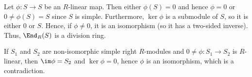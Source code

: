 Let $\phi\colon S\to S$ be an $R$-linear map. Then either
$\phi(S) = 0$ and hence $\phi = 0$ or $0\neq \phi(S) = S$ since $S$ is simple.
Furthermore, $\ker \phi$ is a submodule of $S$, so it is either $0$ or $S$. Hence,
if $\phi\neq 0$, it is an isomorphism (so it has a two-sided inverse).
Thus, $\End_R(S)$ is a division ring.

If $S_1$ and $S_2$ are non-isomorphic simple right $R$-modules and
$0\neq\phi\colon S_1\to S_2$ is  $R$-linear, then $\im\phi = S_2$ and
$\ker\phi = 0$, hence $\phi$ is an isomorphism, which is a contradiction.
